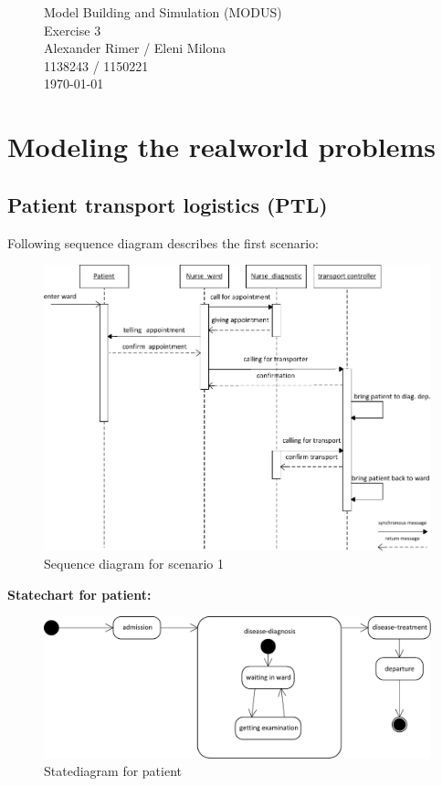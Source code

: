 \begin{figure}
\centering
{\Huge Model Building and Simulation (MODUS)}\\[0.5cm]
{\Huge Exercise 3}\\[0.5cm]
{\Large Alexander Rimer / Eleni Milona}\\[0.6cm]  
{\Large 1138243 / 1150221}\\[0.6cm]  
\today
\end{figure}

\section{Modeling the realworld problems}
\subsection{Patient transport logistics (PTL)}
Following sequence diagram describes the first scenario: 
\begin{figure}[!htb]
  \centering   
  \includegraphics[width=1\textwidth]{pics/ub3/a/1a_seq} 
  \caption{Sequence diagram for scenario 1}
  \label{fig:1a_seq_dia} 
 \end{figure}
\newpage

\textbf{Statechart for patient:}
\begin{figure}[!htb]
  \centering  
  \includegraphics[width=1\textwidth]{pics/ub3/a/1a_pat} 
  \caption{Statediagram for patient}
  \label{fig:1a_pat_dia} 
 \end{figure}
 
